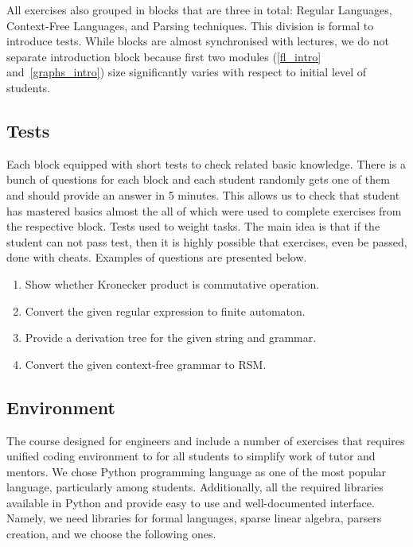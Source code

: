 \documentclass[sigconf]{acmart}
\begin{document}
All exercises also grouped in blocks that are three in total: Regular Languages, Context-Free Languages, and Parsing techniques.
This division is formal to introduce tests.
While blocks are almost synchronised with lectures, we do not separate introduction block because first two modules (\ref{fl_intro} and~\ref{graphs_intro}) size significantly varies with respect to initial level of students.


\subsection{Tests}

Each block equipped with short tests to check related basic knowledge.
There is a bunch of questions for each block and each student randomly gets one of them and should provide an answer in 5 minutes. 
This allows us to check that student has mastered basics almost the all of which were used to complete exercises from the respective block.
Tests used to weight tasks.
The main idea is that if the student can not pass test, then it is highly possible that exercises, even be passed, done with cheats.
Examples of questions are presented below.
\begin{enumerate}
   \item Show whether Kronecker product is commutative operation. 
   \item Convert the given regular expression to finite automaton.
   \item Provide a derivation tree for the given string and grammar.
   \item Convert the given context-free grammar to RSM.
\end{enumerate}


\subsection{Environment}

The course designed for engineers and include a number of exercises that requires unified coding environment to for all students to simplify work of tutor and mentors.
We chose Python programming language as one of the most popular language, particularly among students.
Additionally, all the required libraries available in Python and provide easy to use and well-documented interface.
Namely, we need libraries for formal languages, sparse linear algebra, parsers creation, and we choose the following ones.
\end{document}
